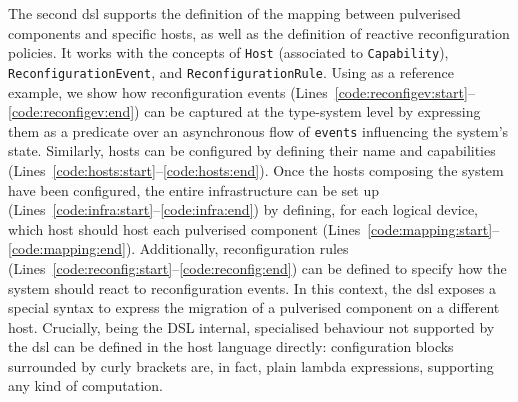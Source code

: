 \documentclass[conference]{IEEEtran}
\begin{document}
The second \ac{dsl} supports the definition of the mapping between pulverised components and specific hosts,
as well as the definition of reactive reconfiguration policies.
%
It works with the concepts of \texttt{Host}
(associated to \texttt{Capability}),
\texttt{ReconfigurationEvent},
and \texttt{ReconfigurationRule}.
%
Using  as a reference example,
we show how reconfiguration events (Lines~\ref{code:reconfigev:start}--\ref{code:reconfigev:end}) can be captured at the type-system level
by expressing them as a predicate over an asynchronous flow of \texttt{events} influencing the system's state.
%
Similarly, hosts can be configured by defining their name and capabilities (Lines~\ref{code:hosts:start}--\ref{code:hosts:end}).
%
Once the hosts composing the system have been configured,
the entire infrastructure can be set up (Lines~\ref{code:infra:start}--\ref{code:infra:end}) by defining,
for each logical device,
which host should host each pulverised component (Lines~\ref{code:mapping:start}--\ref{code:mapping:end}).
%
Additionally,
reconfiguration rules (Lines~\ref{code:reconfig:start}--\ref{code:reconfig:end}) can be defined to specify how the system should react to reconfiguration events.
%
In this context, the \ac{dsl} exposes a special syntax to express the migration of a pulverised component on a different host.
%
Crucially, being the DSL internal,
specialised behaviour not supported by the \ac{dsl} can be defined in the host language directly:
configuration blocks surrounded by curly brackets are,
in fact,
plain lambda expressions, supporting any kind of computation.
\end{document}
